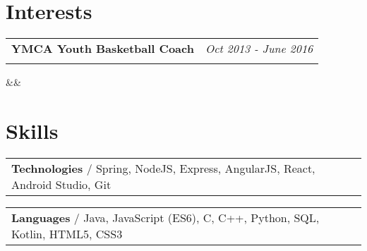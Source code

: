 \documentclass[11.9pt,letterpaper,sans]{moderncv}
\makeatletter
\renewcommand*{\cventry}[7][.25em]{
  \begin{tabular*}{\textwidth}{l@{\extracolsep{\fill}}r}%
      {\bfseries #3\ifthenelse{\equal{#6}{}}{}{, #6}} & {\itshape #2}\\%
      {\itshape #4} & {\itshape #5}\\%
  \end{tabular*}%
  \ifx&#7&%
    \else{\\\vbox{\small#7}}\fi%
  \par\addvspace{#1}}
\makeatother
\begin{document}
	\fi

	\vspace*{-0.5cm}

\setlength{\hintscolumnwidth}{0.1\textwidth}




\section{\textbf{Interests}}
\setlength{\hintscolumnwidth}{0.175\textwidth}

\vspace*{0.0cm}
\renewcommand*{\cvitem}[3][.2em]{%
  \begin{tabular}{@{}p{\maincolumnwidth}@{\hspace{\separatorcolumnwidth}}p{\hintscolumnwidth}@{}}%
    {#3} &\raggedleft\hintstyle{#2}%
  \end{tabular}%
  \par\addvspace{#1}}

\cventry{\textcolor{color1}{Oct 2013 - June 2016}}{YMCA Youth Basketball Coach}{}{}{}{}
\vspace*{-0.6cm}




\setlength{\hintscolumnwidth}{0.1\textwidth}

\section{\textbf{Skills}}
\setlength{\hintscolumnwidth}{0.0000000001\textwidth}
	\cvitem{}{\textbf{Technologies} / Spring, NodeJS, Express, AngularJS, React, Android Studio, Git}
	\cvitem{}{\textbf{Languages} / Java, JavaScript (ES6), C, C++, Python, SQL, Kotlin, HTML5, CSS3}

\setlength{\hintscolumnwidth}{0.1\textwidth}
\end{document}
